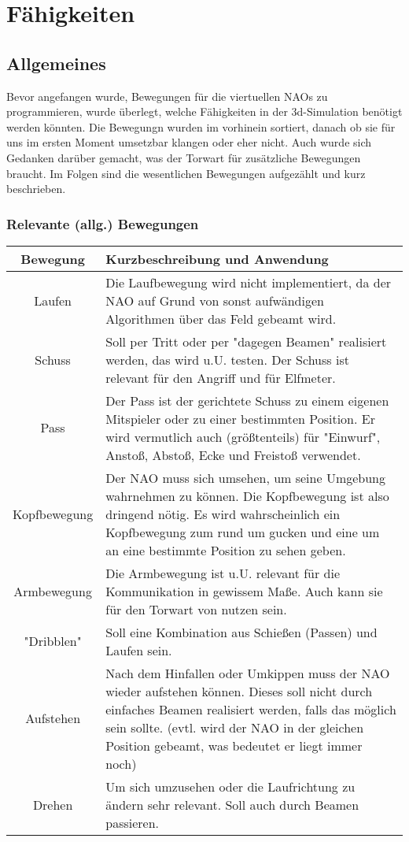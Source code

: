 \section{Fähigkeiten}
\subsection{Allgemeines}
Bevor angefangen wurde, Bewegungen für die viertuellen NAOs zu 
programmieren, wurde überlegt, welche Fähigkeiten in der 3d-Simulation 
benötigt werden könnten. Die Bewegungn wurden im vorhinein sortiert, 
danach ob sie für uns im ersten Moment umsetzbar klangen oder eher 
nicht. Auch wurde sich Gedanken darüber gemacht, was der Torwart für 
zusätzliche Bewegungen braucht. Im Folgen sind die wesentlichen 
Bewegungen aufgezählt und kurz beschrieben.

\subsubsection{Relevante (allg.) Bewegungen}

\begin{tabular}{|c|p{12cm}|}
\hline 
Bewegung & Kurzbeschreibung und Anwendung \\ 
\hline 
Laufen & Die Laufbewegung wird nicht implementiert, da der NAO auf Grund von sonst aufwändigen Algorithmen über das Feld gebeamt wird. \\ 
\hline 
Schuss & Soll per Tritt oder per "dagegen Beamen" realisiert werden, das wird 
u.U. testen. Der Schuss ist relevant für den Angriff und für Elfmeter. \\ 
\hline 
Pass & Der Pass ist der gerichtete Schuss zu einem eigenen Mitspieler oder 
zu einer bestimmten Position. Er wird vermutlich auch (größtenteils) für
 "Einwurf", Anstoß, Abstoß, Ecke und Freistoß verwendet. \\ 
\hline 
Kopfbewegung & Der NAO muss sich umsehen, um seine Umgebung wahrnehmen zu können. 
Die Kopfbewegung ist also dringend nötig. Es wird wahrscheinlich ein 
Kopfbewegung zum rund um gucken und eine um an eine bestimmte Position 
zu sehen geben. \\ 
\hline 
Armbewegung & Die Armbewegung ist u.U. relevant für die Kommunikation in gewissem Maße. Auch kann sie für den Torwart von nutzen sein. \\ 
\hline 
"Dribblen" & Soll eine Kombination aus Schießen (Passen) und Laufen sein. \\ 
\hline 
Aufstehen & Nach dem Hinfallen oder Umkippen muss der NAO wieder aufstehen 
können. Dieses soll nicht durch einfaches Beamen realisiert werden, 
falls das möglich sein sollte. (evtl. wird der NAO in der gleichen 
Position gebeamt, was bedeutet er liegt immer noch) \\ 
\hline 
Drehen & Um sich umzusehen oder die Laufrichtung zu ändern sehr relevant. Soll auch durch Beamen passieren.\\ 
\hline 
\end{tabular} 


